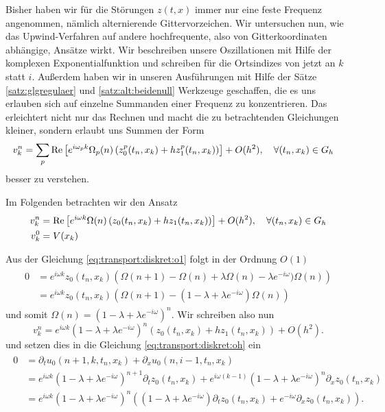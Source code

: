 
Bisher haben wir für die Störungen $z(t,x)$ immer nur eine feste Frequenz angenommen, nämlich alternierende Gittervorzeichen.
Wir untersuchen nun, wie das Upwind-Verfahren auf andere hochfrequente, also von Gitterkoordinaten abhängige, Ansätze wirkt.
Wir beschreiben unsere Oszillationen mit Hilfe der komplexen Exponentialfunktion und schreiben für die Ortsindizes von jetzt an $k$ statt $i$.
Außerdem haben wir in unseren Ausführungen mit Hilfe der Sätze \ref{satz:glgregulaer} und \ref{satz:alt:beidenull} Werkzeuge geschaffen, die es uns erlauben sich auf einzelne Summanden einer Frequenz zu konzentrieren.
Das erleichtert nicht nur das Rechnen und macht die zu betrachtenden Gleichungen kleiner, sondern erlaubt uns Summen der Form
\begin{align}
v^n_k &= \sum_{p} \operatorname{Re} \left[ e^{i \omega_p k} \Omega_p(n) \left( z^p_0(t_n, x_k) + h z^p_1(t_n, x_k) \right) \right] + O(h^2), \quad \forall (t_n,x_k) \in G_h
\end{align}
besser zu verstehen.

Im Folgenden betrachten wir den Ansatz
\begin{align}\label{exp:ansatz}
\begin{split}
v^n_k &= \operatorname{Re} \left[ e^{i \omega k} \Omega(n) \left( z_0(t_n, x_k) + h z_1(t_n, x_k) \right) \right] + O(h^2), \quad \forall (t_n,x_k) \in G_h\\
v^0_k &= V(x_k)
\end{split}
\end{align}

Aus der Gleichung \eqref{eq:transport:diskret:o1} folgt in der Ordnung $O(1)$
\begin{align} 
\begin{split}
0 &= e^{i \omega k} z_0(t_n, x_k) \left( \Omega(n+1) - \Omega(n) + \lambda \Omega(n) - \lambda e^{-i \omega}) \Omega(n) \right)\\
&= e^{i \omega k} z_0(t_n, x_k) \left(\Omega(n+1) - (1 - \lambda + \lambda e^{-i \omega}) \Omega(n) \right)
\end{split}
\end{align}
und somit $\Omega(n) = (1 - \lambda + \lambda e^{-i \omega})^n$. Wir schreiben also nun 
\[  v^n_k = e^{i \omega k} (1 - \lambda + \lambda e^{-i \omega})^n \left( z_0(t_n, x_k) + h z_1(t_n, x_k) \right) + O(h^2). \]
und setzen dies in die Gleichung \eqref{eq:transport:diskret:oh} ein
\begin{align}
\begin{split}
0 &= \partial_t u_0(n+1, k, t_n, x_k) + \partial_x u_0(n, i-1, t_n, x_k)\\
&= e^{i \omega k} (1 - \lambda + \lambda e^{-i \omega})^{n+1} \partial_t z_0(t_n, x_k) + e^{i \omega (k-1)} (1 - \lambda + \lambda e^{-i \omega})^n \partial_x z_0(t_n, x_k)\\
&= e^{i \omega k} (1 - \lambda + \lambda e^{-i \omega})^{n} \left( (1 - \lambda + \lambda e^{-i \omega}) \partial_t z_0(t_n, x_k) + e^{- i \omega} \partial_x z_0(t_n, x_k) \right).
\end{split}
\end{align}

